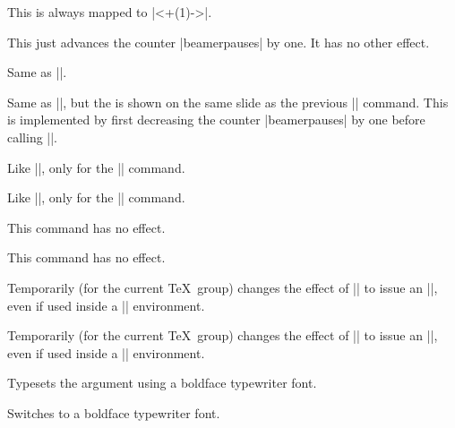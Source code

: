 \begin{command}{\bstep{}}
  This is always mapped to |\uncover<+(1)->|.
\end{command}

\begin{command}{\dstep}
  This just advances the counter |beamerpauses| by one. It has no other effect.
\end{command}

\begin{command}{\vstep}
  Same as |\dstep|.
\end{command}

\begin{command}{\restep{}}
  Same as |\step|, but the  is shown on the same slide as the previous |\step| command. This is implemented by first decreasing the counter |beamerpauses| by one before calling |\step|.
\end{command}

\begin{command}{\reswitch{}}
  Like |\restep|, only for the |\switch| command.
\end{command}

\begin{command}{\rebstep{}}
  Like |\restep|, only for the |\bstep| command.
\end{command}

\begin{command}{\redstep}
  This command has no effect.
\end{command}

\begin{command}{\revstep}
  This command has no effect.
\end{command}

\begin{command}{\boxedsteps}
  Temporarily (for the current \TeX\ group) changes the effect of |\step| to issue an |\uncover|, even if used inside a |\stepwise| environment.
\end{command}

\begin{command}{\nonboxedsteps}
  Temporarily (for the current \TeX\ group) changes the effect of |\step| to issue an |\only|, even if used inside a |\parstepwise| environment.
\end{command}

\begin{command}{\code{}}
  Typesets the argument using a boldface typewriter font.
\end{command}

\begin{command}{\codeswitch}
  Switches to a boldface typewriter font.
\end{command}
